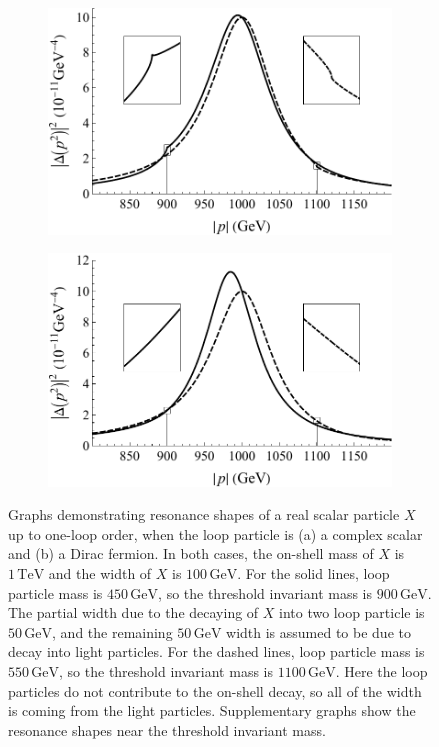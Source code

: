 \documentclass[11pt]{article}
\theoremstyle{definition}
\theoremstyle{remark}
\begin{document}
	\begin{figure}[h]
		\centering
		\begin{subfigure}{0.4\textwidth}
			\centering
			\includegraphics[width=0.9\linewidth]{scalar_resonance_shape.pdf}
			\caption{}
			\label{fig:resonance_shape:scalar}
		\end{subfigure}
		\begin{subfigure}{0.4\textwidth}
			\centering
			\includegraphics[width=0.9\linewidth]{fermion_resonance_shape.pdf}
			\caption{}
			\label{fig:resonance_shape:fermion}
		\end{subfigure}
		\captionsetup{width=.9\linewidth}
		\caption{Graphs demonstrating resonance shapes of a real scalar particle $X$ up to one-loop order, when the loop particle is (a) a complex scalar and (b) a Dirac fermion. In both cases, the on-shell mass of $X$ is $1\,\mathrm{TeV}$ and the width of $X$ is $100\,\mathrm{GeV}$. For the solid lines, loop particle mass is $450\,\mathrm{GeV}$, so the threshold invariant mass is $900\,\mathrm{GeV}$. The partial width due to the decaying of $X$ into two loop particle is $50\,\mathrm{GeV}$, and the remaining $50\,\mathrm{GeV}$ width is assumed to be due to decay into light particles. For the dashed lines, loop particle mass is $550\,\mathrm{GeV}$, so the threshold invariant mass is $1100\,\mathrm{GeV}$. Here the loop particles do not contribute to the on-shell decay, so all of the width is coming from the light particles. Supplementary graphs show the resonance shapes near the threshold invariant mass.}
		\label{fig:resonance_shape}
	\end{figure}
	
\end{document}
